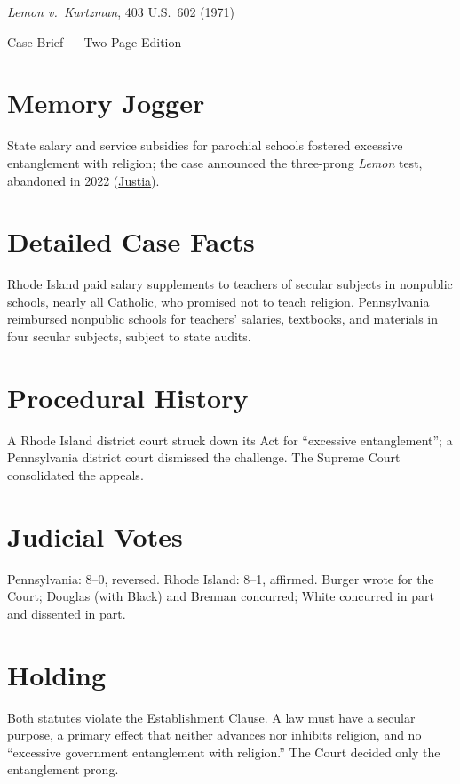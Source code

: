 \documentclass[12pt]{article}
\begin{document}
\begin{center}
{\LARGE \textit{Lemon v.\ Kurtzman}, 403 U.S.\ 602 (1971)\par}
\vspace{0.5em}
{\large Case Brief --- Two-Page Edition\par}
\end{center}

\section{Memory Jogger}
State salary and service subsidies for parochial schools fostered excessive entanglement with religion; the case announced the three-prong \textit{Lemon} test, abandoned in 2022 (\href{https://supreme.justia.com/cases/federal/us/403/602/}{Justia}).

\section{Detailed Case Facts}
Rhode Island paid salary supplements to teachers of secular subjects in nonpublic schools, nearly all Catholic, who promised not to teach religion. Pennsylvania reimbursed nonpublic schools for teachers' salaries, textbooks, and materials in four secular subjects, subject to state audits.

\section{Procedural History}
A Rhode Island district court struck down its Act for ``excessive entanglement''; a Pennsylvania district court dismissed the challenge. The Supreme Court consolidated the appeals.

\section{Judicial Votes}
Pennsylvania: 8--0, reversed. Rhode Island: 8--1, affirmed. Burger wrote for the Court; Douglas (with Black) and Brennan concurred; White concurred in part and dissented in part.

\section{Holding}
Both statutes violate the Establishment Clause. A law must have a secular purpose, a primary effect that neither advances nor inhibits religion, and no ``excessive government entanglement with religion.'' The Court decided only the entanglement prong.
\end{document}
